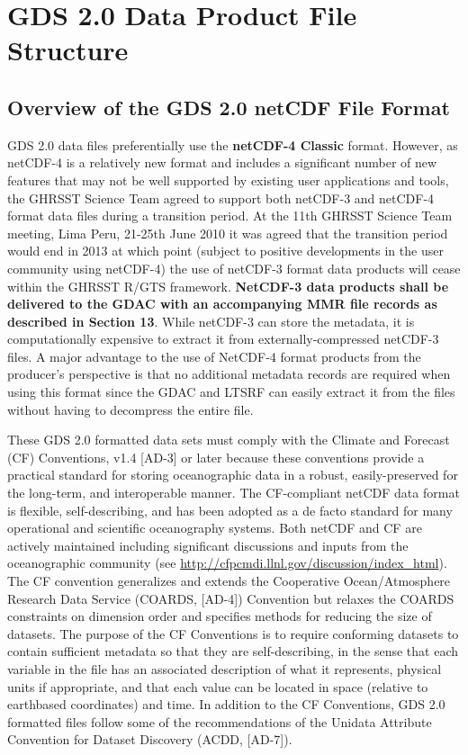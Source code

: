 \pagebreak
\section{GDS 2.0 Data Product File Structure}
\subsection{Overview of the GDS 2.0 netCDF File Format}

GDS 2.0 data files preferentially use the \textbf{netCDF-4 Classic} format. However, as netCDF-4 is a
relatively new format and includes a significant number of new features that may not be well supported
by existing user applications and tools, the GHRSST Science Team agreed to support both netCDF-3
and netCDF-4 format data files during a transition period. At the 11th GHRSST Science Team
meeting, Lima Peru, 21-25th June 2010 it was agreed that the transition period would end in 2013 at
which point (subject to positive developments in the user community using netCDF-4) the use of
netCDF-3 format data products will cease within the GHRSST R/GTS framework. \textbf{NetCDF-3 data
products shall be delivered to the GDAC with an accompanying MMR file records as described
in Section 13}. While netCDF-3 can store the metadata, it is computationally expensive to extract it
from externally-compressed netCDF-3 files. A major advantage to the use of NetCDF-4 format
products from the producer's perspective is that no additional metadata records are required when
using this format since the GDAC and LTSRF can easily extract it from the files without having to
decompress the entire file. \par \vspace{0.1in}


These GDS 2.0 formatted data sets must comply with the Climate and Forecast (CF) Conventions,
v1.4 [AD-3] or later because these conventions provide a practical standard for storing oceanographic
data in a robust, easily-preserved for the long-term, and interoperable manner. The CF-compliant
netCDF data format is flexible, self-describing, and has been adopted as a de facto standard for many
operational and scientific oceanography systems. Both netCDF and CF are actively maintained
including significant discussions and inputs from the oceanographic community (see \url{http://cfpcmdi.llnl.gov/discussion/index_html}). 
The CF convention generalizes and extends the Cooperative
Ocean/Atmosphere Research Data Service (COARDS, [AD-4]) Convention but relaxes the COARDS
constraints on dimension order and specifies methods for reducing the size of datasets. The purpose
of the CF Conventions is to require conforming datasets to contain sufficient metadata so that they are
self-describing, in the sense that each variable in the file has an associated description of what it
represents, physical units if appropriate, and that each value can be located in space (relative to earthbased coordinates) and time. In addition to the CF Conventions, GDS 2.0 formatted files follow some
of the recommendations of the Unidata Attribute Convention for Dataset Discovery (ACDD, [AD-7]). \par \vspace{0.1in}

